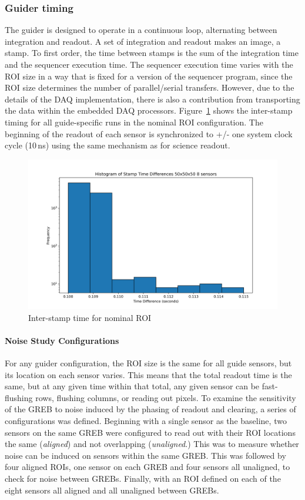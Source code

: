 \subsubsection{Guider timing}
The guider is designed to operate in a continuous loop, alternating between integration and readout. A set of integration and readout makes an image, a stamp. To first order, the time between stamps is the sum of the integration time and the sequencer execution time. The sequencer execution time varies with the ROI size in a way that is fixed for a version of the sequencer program, since the ROI size determines the number of parallel/serial transfers. However, due to the details of the DAQ implementation, there is also a contribution from transporting the data within the embedded DAQ processors. Figure~\ref{fig:guider_timing} shows the inter-stamp timing for all guide-specific runs in the nominal ROI configuration. The beginning of the readout of each sensor is synchronized to +/- one system clock cycle (10\,ns) using the same mechanism as for science readout.

\begin{figure}[ht]
    \centering
    \includegraphics[width=0.95\linewidth]{figures/guider_timing.png}
    \caption{Inter-stamp time for nominal ROI}
    \label{fig:guider_timing}
\end{figure}

\paragraph*{Noise Study Configurations}
For any guider configuration, the ROI size is the same for all guide sensors, but its location on each sensor varies. This means that the total readout time is the same, but at any given time within that total, any given sensor can be fast-flushing rows, flushing columns, or reading out pixels. To examine the sensitivity of the GREB to noise induced by the phasing of readout and clearing, a series of configurations was defined. Beginning with a single sensor as the baseline, two sensors on the same GREB were configured to read out with their ROI locations the same (\textit{aligned}) and not overlapping (\textit{unaligned}.) This was to measure whether noise can be induced on sensors within the same GREB. This was followed by four aligned ROIs, one sensor on each GREB and four sensors all unaligned, to check for noise between GREBs. Finally, with an ROI defined on each of the eight sensors all aligned and all unaligned between GREBs.

